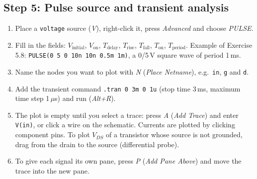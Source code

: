 \subsection{Step 5: Pulse source and transient analysis}
\begin{enumerate}[itemsep=2pt]
  \item Place a \texttt{voltage} source (\textit{V}), right-click it, press \textit{Advanced} and choose \textit{PULSE}.
  \item Fill in the fields: $V_{\mathrm{initial}}$, $V_{\mathrm{on}}$, $T_{\mathrm{delay}}$, $T_{\mathrm{rise}}$, $T_{\mathrm{fall}}$,
        $T_{\mathrm{on}}$, $T_{\mathrm{period}}$. Example of Exercise 5.8: \texttt{PULSE(0 5 0 10n 10n 0.5m 1m)}, a 0/5\,V square wave of period 1\,ms.
  \item Name the nodes you want to plot with \textit{N} (\textit{Place Netname}), e.g.\ \texttt{in}, \texttt{g} and \texttt{d}.
  \item Add the transient command \texttt{.tran 0 3m 0 1u} (stop time 3\,ms, maximum time step 1\,$\mu$s) and run (\textit{Alt+R}).
  \item The plot is empty until you select a trace: press \textit{A} (\textit{Add Trace}) and enter \texttt{V(in)}, or click a wire on the schematic.
        Currents are plotted by clicking component pins. To plot $V_{DS}$ of a transistor whose source is not grounded,
        drag from the drain to the source (differential probe).
  \item To give each signal its own pane, press \textit{P} (\textit{Add Pane Above}) and move the trace into the new pane.
\end{enumerate}

